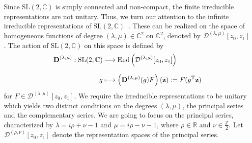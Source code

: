 \documentclass[11pt,a4paper]{article}
\newcommand{\R}{\mathbb R}
\newcommand{\C}{\mathbb C}
\newcommand{\SL}{\text{SL$(2,\C)$}}
\newcommand{\defeq}{\vcentcolon=}
\begin{document}
Since $\SL$ is simply connected and non-compact, the finite irreducible representations are not unitary. Thus, we turn our attention to the infinite irreducible representations of $\SL$~\cite{Martin-Dussaud:2019ypf}. These can be realized on the space of homogeneous functions of degree $(\lambda,\mu)\in\C^2$ on $\C^2$, denoted by $\mathcal{D}^{(\lambda,\mu)}[z_0,z_1]$. The action of $\SL$ on this space is defined by
%
\begin{equation}
\begin{aligned}
\mathbf{D}^{(\lambda,\mu)}: \SL & \longrightarrow \text{End}\left(\mathcal{D}^{(\lambda,\mu)}[z_0,z_1]\right)\\[7pt]
g & \longmapsto \left(\mathbf{D}^{(\lambda,\mu)}(g)F\right)(\vb{z})\defeq F(g^{\text{T}}\vb{z})
\end{aligned}
\end{equation}
%
for $F\in\mathcal{D}^{(\lambda,\mu)}[z_0,z_1]$. We require the irreducible representations to be unitary which yields two distinct conditions on the degrees $(\lambda,\mu)$, the principal series and the complementary series. We are going to focus on the principal series, characterized by $\lambda = i\rho+\nu-1$ and $\mu =i\rho-\nu-1$, where $\rho\in\R$ and $\nu\in\frac{\mathbb{Z}}{2}$. Let $\mathcal{D}^{(\rho,\nu)}[z_0,z_1]$ denote the representation spaces of the principal series.
\end{document}
